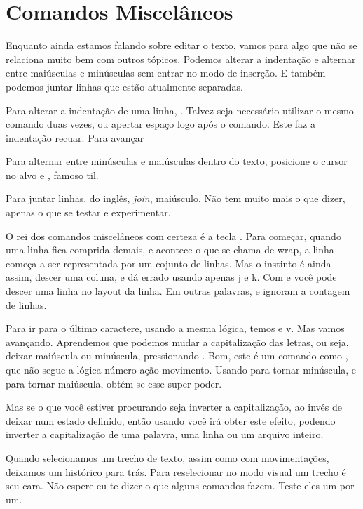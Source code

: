 \section{Comandos Miscelâneos}
Enquanto ainda estamos falando sobre editar o texto, vamos para algo que não se relaciona muito bem com outros tópicos.
Podemos alterar a indentação e alternar entre maiúsculas e minúsculas sem entrar no modo de inserção.
E também podemos juntar linhas que estão atualmente separadas.

Para alterar a indentação de uma linha, \vimcommand{$<$}.
Talvez seja necessário utilizar o mesmo comando duas vezes, ou apertar espaço logo após o comando.
Este faz a indentação recuar.
Para avançar \vimcommand{$>$}

Para alternar entre minúsculas e maiúsculas dentro do texto, posicione o cursor no alvo
e \vimcommand{\~}, famoso til. 

Para juntar linhas, do inglês, \textit{join},  maiúsculo.
Não tem muito mais o que dizer, apenas o que se testar e experimentar.

O rei dos comandos miscelâneos com certeza é a tecla .
Para começar, quando uma linha fica comprida demais, e acontece o que se chama de wrap,
a linha começa a ser representada por um cojunto de linhas.
Mas o instinto é ainda assim, descer uma coluna, e dá errado usando apenas j e k.
Com  e  você pode descer uma linha no layout da linha.
Em outras palavras,  e  ignoram a contagem de linhas.

Para ir para o último caractere, usando a mesma lógica, temos  e v.
Mas vamos avançando. Aprendemos que podemos mudar a capitalização das letras, ou seja,
deixar maiúscula ou minúscula, pressionando \vimcommand{~}.
Bom, este é um comando como , que não segue a lógica número-ação-movimento.
Usando  para tornar minúscula, e  para tornar maiúscula,
obtém-se esse super-poder.

Mas se o que você estiver procurando seja inverter a capitalização, ao invés de
deixar num estado definido, então usando  você irá obter este
efeito, podendo inverter a capitalização de uma palavra, uma linha ou um
arquivo inteiro.

Quando selecionamos um trecho de texto, assim como com movimentações, deixamos um histórico para trás.
Para reselecionar no modo visual um trecho  é seu cara.
Não espere eu te dizer o que alguns comandos fazem. Teste eles um por um.

